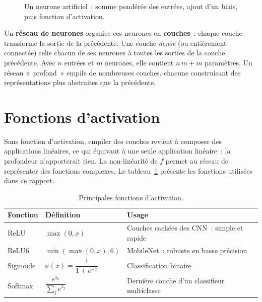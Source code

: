 \begin{figure}[H]
\centering
{}
\caption{Un neurone artificiel~: somme pondérée des entrées, ajout d’un biais, puis fonction d’activation.}\label{fig:neurone}
\end{figure}

Un \textbf{réseau de neurones} organise ces neurones en \textbf{couches}~: chaque couche transforme la sortie de la précédente. Une couche \emph{dense} (ou entièrement connectée) relie chacun de ses neurones à toutes les sorties de la couche précédente. Avec $n$ entrées et $m$ neurones, elle contient $n\,m + m$ paramètres. Un réseau «~profond~» empile de nombreuses couches, chacune construisant des représentations plus abstraites que la précédente.

\section{Fonctions d’activation}

Sans fonction d’activation, empiler des couches revient à composer des applications linéaires, ce qui équivaut à une seule application linéaire~: la profondeur n’apporterait rien. La non-linéarité de $f$ permet au réseau de représenter des fonctions complexes. Le tableau~\ref{tab:activations} présente les fonctions utilisées dans ce rapport.

\begin{table}[H]
\centering
\caption{Principales fonctions d’activation.}\label{tab:activations}
\small
\begin{tabular}{@{}llp{6.2cm}@{}}
\toprule
\textbf{Fonction} & \textbf{Définition} & \textbf{Usage} \\
\midrule
ReLU & $\max(0,x)$ & Couches cachées des CNN~: simple et rapide \\
ReLU6 & $\min(\max(0,x),6)$ & MobileNet~: robuste en basse précision \\
Sigmoïde & $\sigma(x)=\dfrac{1}{1+e^{-x}}$ & Classification binaire \\
Softmax & $\dfrac{e^{z_k}}{\sum_j e^{z_j}}$ & Dernière couche d’un classifieur multiclasse \\
\bottomrule
\end{tabular}
\end{table}

